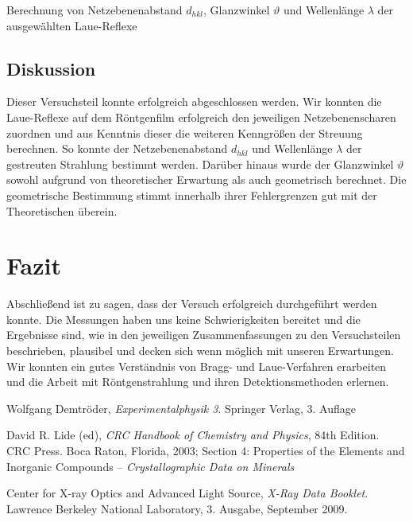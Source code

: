 \documentclass[11pt, a4paper]{article}
\begin{document}
\begin{table}[h]
\centering

\caption{Berechnung von Netzebenenabstand $d_{hkl}$, Glanzwinkel $\vartheta$ und Wellenlänge $\lambda$ der ausgewählten Laue-Reflexe}
\label{tab:laue_winkel}
\end{table}

\subsection{Diskussion}
Dieser Versuchsteil konnte erfolgreich abgeschlossen werden.
Wir konnten die Laue-Reflexe auf dem Röntgenfilm erfolgreich den jeweiligen Netzebenenscharen zuordnen und aus Kenntnis dieser die weiteren Kenngrößen der Streuung berechnen.
So konnte der Netzebenenabstand $d_{hkl}$ und Wellenlänge $\lambda$ der gestreuten Strahlung bestimmt werden.
Darüber hinaus wurde der Glanzwinkel $\vartheta$ sowohl aufgrund von theoretischer Erwartung als auch geometrisch berechnet.
Die geometrische Bestimmung stimmt innerhalb ihrer Fehlergrenzen gut mit der Theoretischen überein.


\section{Fazit}
Abschließend ist zu sagen, dass der Versuch erfolgreich durchgeführt werden konnte.
Die Messungen haben uns keine Schwierigkeiten bereitet und die Ergebnisse sind, wie in den jeweiligen Zusammenfassungen zu den Versuchsteilen beschrieben, plausibel und decken sich wenn möglich mit unseren Erwartungen.
Wir konnten ein gutes Verständnis von Bragg- und Laue-Verfahren erarbeiten und die Arbeit mit Röntgenstrahlung und ihren Detektionsmethoden erlernen. 




\begin{thebibliography}{9}
	Wolfgang Demtröder,
	\emph{Experimentalphysik 3}.
	Springer Verlag,
	3. Auflage

  David R. Lide (ed),
  \emph{CRC Handbook of Chemistry and Physics},
  84th Edition. CRC Press. Boca Raton, Florida, 2003;
  Section 4: Properties of the Elements and Inorganic Compounds --
  \emph{Crystallographic Data on Minerals}

  Center for X-ray Optics and Advanced Light Source,
  \emph{X-Ray Data Booklet}.
  Lawrence Berkeley National Laboratory,
  3. Ausgabe,
  September 2009.
\end{thebibliography}
\end{document}

